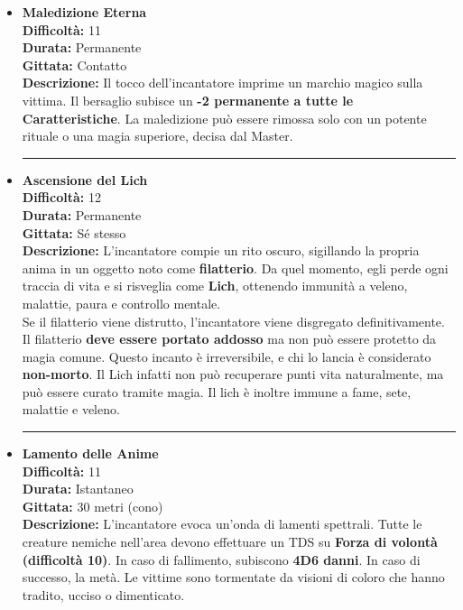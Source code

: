 \documentclass[./magie.tex]{subfiles}
\begin{document}
\begin{itemize}

\item \textbf{Maledizione Eterna} \\
\textbf{Difficoltà:} 11 \\
\textbf{Durata:} Permanente \\
\textbf{Gittata:} Contatto \\
\textbf{Descrizione:} Il tocco dell’incantatore imprime un marchio magico sulla vittima. Il bersaglio subisce un \textbf{-2 permanente a tutte le Caratteristiche}. La maledizione può essere rimossa solo con un potente rituale o una magia superiore, decisa dal Master.

\vspace{0.5cm}\rule{\textwidth}{0.4pt}\vspace{1cm}

\item \textbf{Ascensione del Lich} \\
\textbf{Difficoltà:} 12 \\
\textbf{Durata:} Permanente \\
\textbf{Gittata:} Sé stesso \\
\textbf{Descrizione:} L’incantatore compie un rito oscuro, sigillando la propria anima in un oggetto noto come \textbf{filatterio}. Da quel momento, egli perde ogni traccia di vita e si risveglia come \textbf{Lich}, ottenendo immunità a veleno, malattie, paura e controllo mentale.\\
Se il filatterio viene distrutto, l’incantatore viene disgregato definitivamente. Il filatterio \textbf{deve essere portato addosso} ma non può essere protetto da magia comune. Questo incanto è irreversibile, e chi lo lancia è considerato \textbf{non-morto}. Il Lich infatti non può recuperare punti vita naturalmente, ma può essere curato tramite magia. Il lich è inoltre immune a fame, sete, malattie e veleno.\\

\vspace{0.5cm}\rule{\textwidth}{0.4pt}\vspace{1cm}
\clearpage
\item \textbf{Lamento delle Anime} \\
\textbf{Difficoltà:} 11 \\
\textbf{Durata:} Istantaneo \\
\textbf{Gittata:} 30 metri (cono) \\
\textbf{Descrizione:} L’incantatore evoca un’onda di lamenti spettrali. Tutte le creature nemiche nell’area devono effettuare un TDS su \textbf{Forza di volontà (difficoltà 10)}. In caso di fallimento, subiscono \textbf{4D6 danni}. In caso di successo, la metà. Le vittime sono tormentate da visioni di coloro che hanno tradito, ucciso o dimenticato.


\end{itemize}
\end{document}
